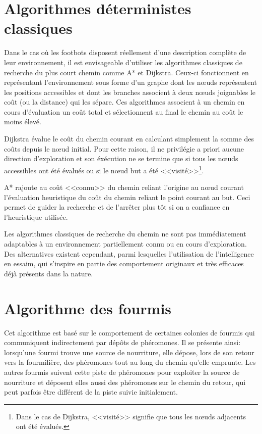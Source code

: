 \section{Algorithmes déterministes classiques}

Dans le cas où les footbots disposent réellement d'une description complète de leur environnement, il est envisageable d'utiliser les algorithmes classiques de recherche du plus court chemin comme A* et Dijkstra. Ceux-ci fonctionnent en représentant l'environnement sous forme d'un graphe dont les n\oe{}uds représentent les positions accessibles et dont les branches associent à deux n\oe{}uds joignables le coût (ou la distance) qui les sépare. Ces algorithmes associent à un chemin en cours d'évaluation un coût total et sélectionnent au final le chemin au coût le moins élevé.

Dijkstra évalue le coût du chemin courant en calculant simplement la somme des coûts depuis le n\oe{}ud initial. Pour cette raison, il ne privilégie a priori aucune direction d'exploration et son éxécution ne se termine que si tous les n\oe{}uds accessibles ont été évalués ou si le n\oe{}ud but a été <<visité>>\footnote{Dans le cas de Dijkstra, <<visité>> signifie que tous les n\oe{}uds adjacents ont été évalués.}.

A* rajoute au coût <<connu>> du chemin reliant l'origine au n\oe{}ud courant l'évaluation heuristique du coût du chemin reliant le point courant au but. Ceci permet de guider la recherche et de l'arrêter plus tôt si on a confiance en l'heuristique utilisée.~\cite{mehlhorn_shortest_2008,genetic2007}

Les algorithmes classiques de recherche du chemin ne sont pas immédiatement adaptables à un environnement partiellement connu ou en cours d'exploration. Des alternatives existent cependant, parmi lesquelles l'utilisation de l'intelligence en essaim, qui s'inspire en partie  des comportement originaux et très efficaces déjà présents dans la nature.

\section{Algorithme des fourmis}

Cet algorithme est basé sur le comportement de certaines colonies de fourmis qui communiquent indirectement par dépôts de phéromones. Il se présente ainsi: lorsqu'une fourmi trouve une source de nourriture, elle dépose, lors de son retour vers la fourmilière, des phéromones tout au long du chemin qu'elle emprunte. Les autres fourmis suivent cette piste de phéromones pour exploiter la source de nourriture et déposent elles aussi des phéromones sur le chemin du retour, qui peut parfois être différent de la piste suivie initialement.

